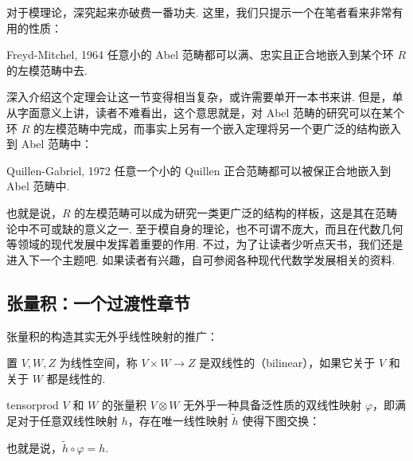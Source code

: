 对于模理论，深究起来亦破费一番功夫. 这里，我们只提示一个在笔者看来非常有用的性质：

\begin{theorem}{Freyd-Mitchel, 1964}{}
    任意小的 Abel 范畴都可以满、忠实且正合地嵌入到某个环 $R$ 的左模范畴中去.
\end{theorem}

深入介绍这个定理会让这一节变得相当复杂，或许需要单开一本书来讲. 但是，单从字面意义上讲，读者不难看出，这个意思就是，对 Abel 范畴的研究可以在某个环 $R$ 的左模范畴中完成，而事实上另有一个嵌入定理将另一个更广泛的结构嵌入到 Abel 范畴中：

\begin{theorem}{Quillen-Gabriel, 1972}{}
    任意一个小的 Quillen 正合范畴都可以被保正合地嵌入到 Abel 范畴中.
\end{theorem}

也就是说，$R$ 的左模范畴可以成为研究一类更广泛的结构的样板，这是其在范畴论中不可或缺的意义之一. 至于模自身的理论，也不可谓不庞大，而且在代数几何等领域的现代发展中发挥着重要的作用. 不过，为了让读者少听点天书，我们还是进入下一个主题吧. 如果读者有兴趣，自可参阅各种现代代数学发展相关的资料.

\subsection{张量积：一个过渡性章节}

张量积的构造其实无外乎线性映射的推广：

\begin{definition}{}{}
    置 $V, W, Z$ 为线性空间，称 $V \times W \to Z$ 是双线性的（bilinear），如果它关于 $V$ 和关于 $W$ 都是线性的.
\end{definition}

\begin{definition}{}{tensorprod}
    $V$ 和 $W$ 的张量积 $V \otimes W$ 无外乎一种具备泛性质的双线性映射 $\varphi$，即满足对于任意双线性映射 $h$，存在唯一线性映射 $\widetilde h$ 使得下图交换：

    \begin{center}
    \end{center}

    也就是说，$\widetilde h \circ \varphi = h$.
\end{definition}

